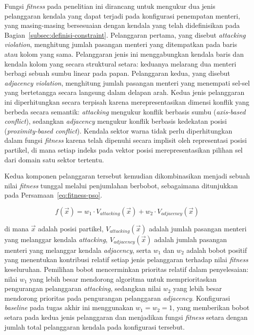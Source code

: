 Fungsi \textit{fitness} pada penelitian ini dirancang untuk mengukur dua jenis pelanggaran kendala yang dapat terjadi pada konfigurasi penempatan menteri, yang masing-masing bersesuaian dengan kendala yang telah didefinisikan pada Bagian~\ref{subsec:definisi-constraint}. Pelanggaran pertama, yang disebut \textit{attacking violation}, menghitung jumlah pasangan menteri yang ditempatkan pada baris atau kolom yang sama. Pelanggaran jenis ini menggabungkan kendala baris dan kendala kolom yang secara struktural setara: keduanya melarang dua menteri berbagi sebuah sumbu linear pada papan. Pelanggaran kedua, yang disebut \textit{adjacency violation}, menghitung jumlah pasangan menteri yang menempati sel-sel yang bertetangga secara langsung dalam delapan arah. Kedua jenis pelanggaran ini diperhitungkan secara terpisah karena merepresentasikan dimensi konflik yang berbeda secara semantik: \textit{attacking} mengukur konflik berbasis sumbu (\textit{axis-based conflict}), sedangkan \textit{adjacency} mengukur konflik berbasis kedekatan posisi (\textit{proximity-based conflict}). Kendala sektor warna tidak perlu diperhitungkan dalam fungsi \textit{fitness} karena telah dipenuhi secara implisit oleh representasi posisi partikel, di mana setiap indeks pada vektor posisi merepresentasikan pilihan sel dari domain satu sektor tertentu.

Kedua komponen pelanggaran tersebut kemudian dikombinasikan menjadi sebuah nilai \textit{fitness} tunggal melalui penjumlahan berbobot, sebagaimana ditunjukkan pada Persamaan~\ref{eq:fitness-pso}.

\begin{equation}
	f(\vec{x}) = w_1 \cdot V_{\textit{attacking}}(\vec{x}) + w_2 \cdot V_{\textit{adjacency}}(\vec{x})
	\label{eq:fitness-pso}
\end{equation}

di mana $\vec{x}$ adalah posisi partikel, $V_{\textit{attacking}}(\vec{x})$ adalah jumlah pasangan menteri yang melanggar kendala \textit{attacking}, $V_{\textit{adjacency}}(\vec{x})$ adalah jumlah pasangan menteri yang melanggar kendala \textit{adjacency}, serta $w_1$ dan $w_2$ adalah bobot positif yang menentukan kontribusi relatif setiap jenis pelanggaran terhadap nilai \textit{fitness} keseluruhan. Pemilihan bobot mencerminkan prioritas relatif dalam penyelesaian: nilai $w_1$ yang lebih besar mendorong algoritma untuk memprioritaskan pengurangan pelanggaran \textit{attacking}, sedangkan nilai $w_2$ yang lebih besar mendorong prioritas pada pengurangan pelanggaran \textit{adjacency}. Konfigurasi \textit{baseline} pada tugas akhir ini menggunakan $w_1 = w_2 = 1$, yang memberikan bobot setara pada kedua jenis pelanggaran dan menjadikan fungsi \textit{fitness} setara dengan jumlah total pelanggaran kendala pada konfigurasi tersebut.

